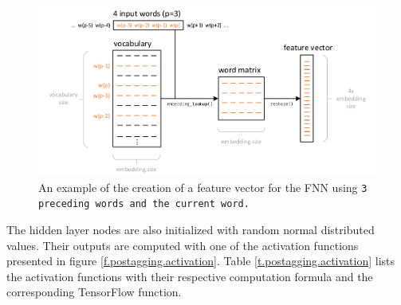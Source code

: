 \begin{figure}[ht]
	\vspace{1.5em}
	\hspace{-1.5em}\includegraphics[width=1.1\textwidth]{images/feature_vector}
	\caption[Creation of the feature vector]{An example of the creation of a feature vector for the FNN using \tt{3} preceding words and the current word.}
	\label{f.fnn.feature}
	\vspace{.5em}
\end{figure}

The hidden layer nodes are also initialized with random normal distributed values. Their outputs are computed with one of the activation functions presented in figure \ref{f.postagging.activation}. Table \ref{t.postagging.activation} lists the activation functions with their respective computation formula and the corresponding TensorFlow function.

